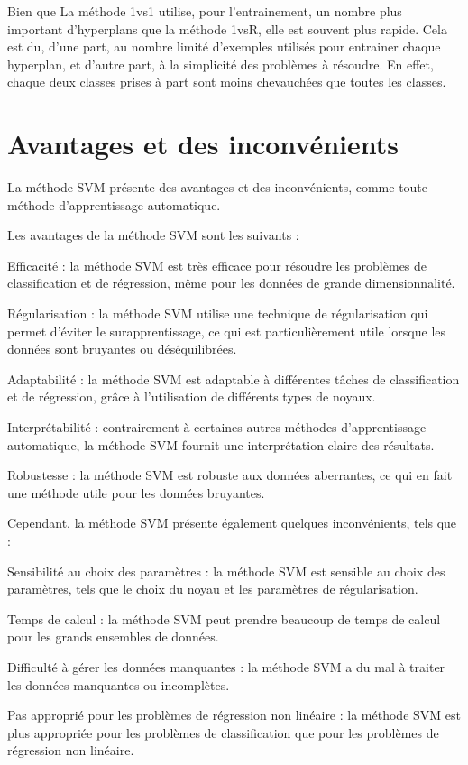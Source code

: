 \documentclass[12pt,a4paper]{report}
\begin{document}
Bien que La méthode 1vs1 utilise, pour l’entrainement, un nombre plus important
d’hyperplans que la méthode 1vsR, elle est souvent plus rapide. Cela est du, d’une part,
au nombre limité d’exemples utilisés pour entrainer chaque hyperplan, et d’autre part, à la
simplicité des problèmes à résoudre. En effet, chaque deux classes prises à part sont moins
chevauchées que toutes les classes.


\chapter{Avantages et des inconvénients}
La méthode SVM présente des avantages et des inconvénients, comme toute méthode d'apprentissage automatique.

Les avantages de la méthode SVM sont les suivants :

Efficacité : la méthode SVM est très efficace pour résoudre les problèmes de classification et de régression, même pour les données de grande dimensionnalité.

Régularisation : la méthode SVM utilise une technique de régularisation qui permet d'éviter le surapprentissage, ce qui est particulièrement utile lorsque les données sont bruyantes ou déséquilibrées.

Adaptabilité : la méthode SVM est adaptable à différentes tâches de classification et de régression, grâce à l'utilisation de différents types de noyaux.

Interprétabilité : contrairement à certaines autres méthodes d'apprentissage automatique, la méthode SVM fournit une interprétation claire des résultats.

Robustesse : la méthode SVM est robuste aux données aberrantes, ce qui en fait une méthode utile pour les données bruyantes.

Cependant, la méthode SVM présente également quelques inconvénients, tels que :

Sensibilité au choix des paramètres : la méthode SVM est sensible au choix des paramètres, tels que le choix du noyau et les paramètres de régularisation.

Temps de calcul : la méthode SVM peut prendre beaucoup de temps de calcul pour les grands ensembles de données.

Difficulté à gérer les données manquantes : la méthode SVM a du mal à traiter les données manquantes ou incomplètes.

Pas approprié pour les problèmes de régression non linéaire : la méthode SVM est plus appropriée pour les problèmes de classification que pour les problèmes de régression non linéaire.
\end{document}
